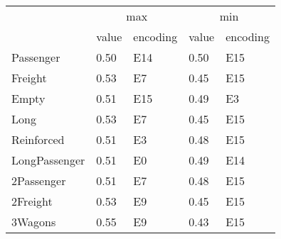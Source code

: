 \begin{tabular}{lllll}
\toprule
 & \multicolumn{2}{c}{max} & \multicolumn{2}{c}{min} \\
 & value & encoding & value & encoding \\
\midrule
Passenger & 0.50 & E14 & 0.50 & E15 \\
Freight & 0.53 & E7 & 0.45 & E15 \\
Empty & 0.51 & E15 & 0.49 & E3 \\
Long & 0.53 & E7 & 0.45 & E15 \\
Reinforced & 0.51 & E3 & 0.48 & E15 \\
LongPassenger & 0.51 & E0 & 0.49 & E14 \\
2Passenger & 0.51 & E7 & 0.48 & E15 \\
2Freight & 0.53 & E9 & 0.45 & E15 \\
3Wagons & 0.55 & E9 & 0.43 & E15 \\
\bottomrule
\end{tabular}
